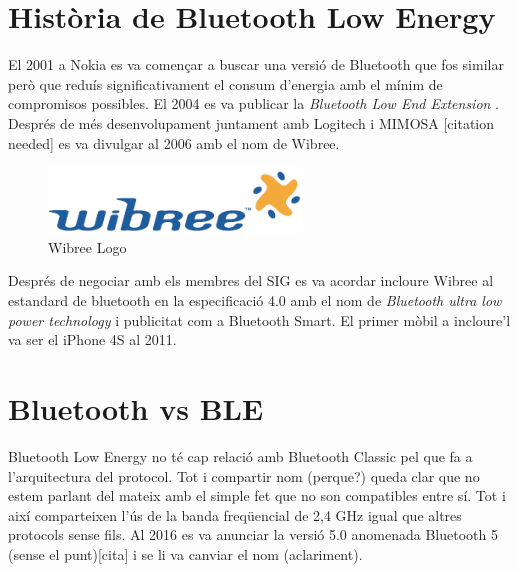 \section{Història de Bluetooth Low Energy}
El 2001 a Nokia es va començar a buscar una versió de Bluetooth que fos similar però que reduís significativament el consum d'energia amb el mínim de compromisos possibles.
El 2004 es va publicar la \textit{Bluetooth Low End Extension} \cite{Original_BLE_Extension}. 
Després de més desenvolupament juntament amb Logitech i MIMOSA [citation needed] es va divulgar al 2006 amb el nom de Wibree.

\begin{figure}[h]
	\begin{center}
		\includegraphics[width=0.6\textwidth]{./images/Wibree_Logo.png}
		\caption{Wibree Logo}
	\end{center}
\end{figure}

Després de negociar amb els membres del SIG es va acordar incloure Wibree al estandard de bluetooth en la especificació 4.0 amb el nom de \textit{Bluetooth ultra low power technology} i publicitat com a Bluetooth Smart. El primer mòbil a incloure'l va ser el iPhone 4S al 2011.

\section{Bluetooth vs BLE}
Bluetooth Low Energy no té cap relació amb Bluetooth Classic pel que fa a l'arquitectura del protocol. Tot i compartir nom (perque?) queda clar que no estem parlant del mateix amb el simple fet que no son compatibles entre sí. Tot i així comparteixen l'ús de la banda freqüencial de 2,4 GHz igual que altres protocols sense fils. Al 2016 es va anunciar la versió 5.0 anomenada Bluetooth 5 (sense el punt)[cita] i se li va canviar el nom (aclariment).


